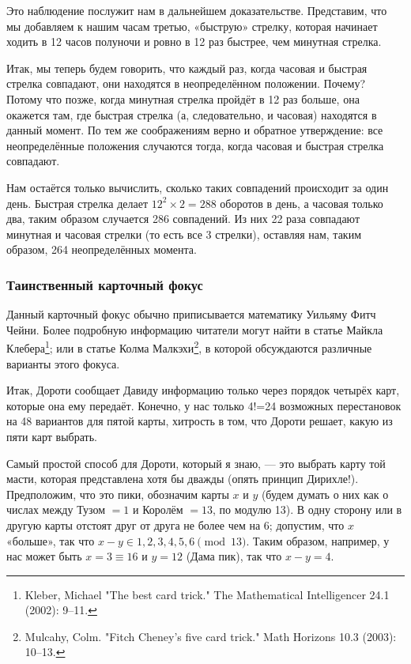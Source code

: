 Это наблюдение послужит нам в дальнейшем доказательстве.
Представим, что мы добавляем к нашим часам третью, «быструю» стрелку, которая начинает ходить в 12 часов полуночи и ровно в 12 раз быстрее, чем минутная стрелка.

Итак, мы теперь будем говорить, что каждый раз, когда часовая и быстрая стрелка совпадают, они находятся в неопределённом положении.
Почему?
Потому что позже, когда минутная стрелка пройдёт в 12 раз больше, она окажется там, где быстрая стрелка (а, следовательно, и часовая) находятся в данный момент.
По тем же соображениям верно и обратное утверждение: все неопределённые положения случаются тогда, когда часовая и быстрая стрелка совпадают.

Нам остаётся только вычислить, сколько таких совпадений происходит за один день.
Быстрая стрелка делает $12^2\times 2 = 288$ оборотов в день, а часовая только два, таким образом случается 286 совпадений.
Из них 22 раза совпадают минутная и часовая стрелки (то есть все 3 стрелки), оставляя нам, таким образом, 264 неопределённых момента.
\heart

\subsubsection*{Таинственный карточный фокус}%

Данный карточный фокус обычно приписывается математику Уильяму Фитч Чейни. %
Более подробную информацию читатели могут найти в статье Майкла Клебера\footnote{Kleber, Michael "The best card trick." The Mathematical Intelligencer 24.1 (2002): 9--11.};
или в статье Колма Малкэхи\footnote{Mulcahy, Colm. "Fitch Cheney's five card trick." Math Horizons 10.3 (2003): 10--13.}, в которой обсуждаются различные варианты этого фокуса.%

Итак, Дороти сообщает Давиду информацию только через порядок четырёх карт, которые она ему передаёт.
Конечно, у нас только 4!=24 возможных перестановок на 48 вариантов для пятой карты, хитрость в том, что Дороти решает, какую из пяти карт выбрать.

Самый простой способ для Дороти, который я знаю, --- это выбрать карту той масти, которая представлена хотя бы дважды (опять принцип Дирихле!).
Предположим, что это пики, обозначим карты $x$ и $y$ (будем думать о них как о числах между Тузом $= 1$ и Королём $= 13$, по модулю 13).
В одну сторону или в другую карты отстоят друг от друга не более чем на 6;
допустим, что $x$ «больше», так что $x-y\in {1,2,3,4,5,6} \pmod{13}$.
Таким образом, например, у нас может быть $x =3\equiv 16$ и $y = 12$ (Дама пик), так что $x - y = 4$.

